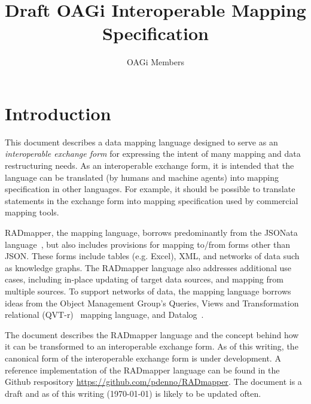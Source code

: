 \documentclass[9pt,letterpaper]{article}
\begin{document}
\title{Draft OAGi Interoperable Mapping Specification}
\author{OAGi Members}
\maketitle

\section{Introduction}
This document describes a data mapping language designed to serve as an \textit{interoperable exchange form} for expressing the intent of many mapping and data restructuring needs.
As an interoperable exchange form, it is intended that the language can be translated (by humans and machine agents) into mapping specification in other languages.
For example, it should be possible to translate statements in the exchange form into mapping specification used by commercial mapping tools.

RADmapper, the mapping language, borrows predominantly from the JSONata language~\cite{Jsonata.org2021}, but also includes provisions for mapping to/from forms other than JSON.\@
These forms include tables (e.g. Excel), XML, and networks of data such as knowledge graphs.
The RADmapper language also addresses additional use cases, including in-place updating of target data sources, and mapping from multiple sources.
To support networks of data, the mapping language borrows ideas from the Object Management Group's Queries, Views and Transformation relational (QVT-r)~\cite{ObjectManagementGroup2016b} mapping language, and Datalog~\cite{Abiteboul1995a}.

The document describes the RADmapper language and the concept behind how it can be transformed to an interoperable exchange form.
As of this writing, the canonical form of the interoperable exchange form is under development.
A reference implementation of the RADmapper language can be found in the Github respository \href{https://github.com/pdenno/RADmapper}{https://github.com/pdenno/RADmapper}. %
The document is a draft and as of this writing (\today) is likely to be updated often.

\end{document}
